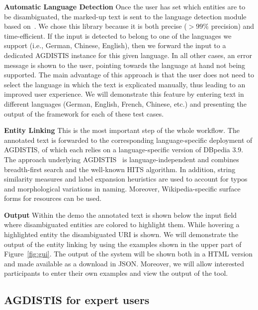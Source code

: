 \noindent\textbf{Automatic Language Detection}
Once the user has set which entities are to be disambiguated, the marked-up text is sent to the language detection module based on~\cite{nakatani2010langdetect}.
We chose this library because it is both precise ($>99\%$ precision) and time-efficient.
If the input is detected to belong to one of the languages we support (i.e., German, Chinese, English), then we forward the input to a dedicated AGDISTIS instance for this given language.
In all other cases, an error message is shown to the user, pointing towards the language at hand not being supported.
The main advantage of this approach is that the user does not need to select the language in which the text is explicated manually, thus leading to an improved user experience. 
We will demonstrate this feature by entering text in different languages (German, English, French, Chinese, etc.) and presenting the output of the framework for each of these test cases.

\noindent\textbf{Entity Linking} 
This is the most important step of the whole workflow.
The annotated text is forwarded to the corresponding language-specific deployment of AGDISTIS, of which each relies on a language-specific version of DBpedia 3.9. 
The approach underlying AGDISTIS~\cite{agdistis_iswc} is language-independent and combines breadth-first search and the well-known HITS algorithm. 
In addition, string similarity measures and label expansion heuristics are used to account for typos and morphological variations in naming.
Moreover, Wikipedia-specific surface forms for resources can be used. 

\noindent\textbf{Output}
Within the demo the annotated text is shown below the input field where disambiguated entities are colored to highlight them. 
While hovering a highlighted entity the disambiguated URI is shown.
We will demonstrate the output of the entity linking by using the examples shown in the upper part of Figure~\ref{fig:gui}. 
The output of the system will be shown both in a HTML version and made available as a download in JSON. 
Moreover, we will allow interested participants to enter their own examples and view the output of the tool.

\subsection{AGDISTIS for expert users}

